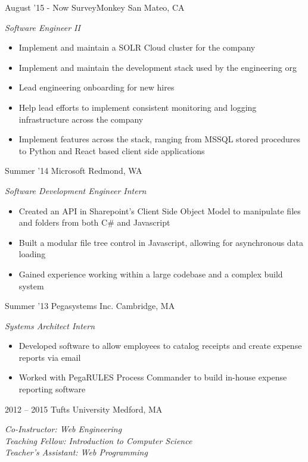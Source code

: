 \documentclass[print]{friggeri-cv} %
\begin{document}
\begin{entrylist}
\entry
{August '15 - Now}
{SurveyMonkey }
{San Mateo, CA}
{\emph{Software Engineer II}
\begin{itemize}
\item Implement and maintain a SOLR Cloud cluster for the company
\item Implement and maintain the development stack used by the engineering org
\item Lead engineering onboarding for new hires
\item Help lead efforts to implement consistent monitoring and logging infrastructure across the company
\item Implement features across the stack, ranging from MSSQL stored procedures to Python and React based client side applications
\end{itemize}}
\entry
{Summer '14}
{Microsoft }
{Redmond, WA}
{\emph{Software Development Engineer Intern}
\begin{itemize}
\item Created an API in Sharepoint's Client Side Object Model to manipulate files and folders from both C\# and Javascript 
\item Built a modular file tree control in Javascript, allowing for asynchronous data loading
\item Gained experience working within a large codebase and a complex build system
\end{itemize}}
\entry
{Summer '13}
{Pegasystems Inc. }
{Cambridge, MA}
{\emph{Systems Architect Intern} 
\begin{itemize}
\item Developed software to allow employees to catalog receipts and create expense reports via email
\item Worked with PegaRULES Process Commander to build in-house expense reporting software
\end{itemize}}
\entry
{2012 -- 2015}
{Tufts University}
{Medford, MA}
{\emph{Co-Instructor: Web Engineering \\Teaching Fellow: Introduction  to Computer Science \\ Teacher's Assistant: Web Programming} 
\begin{itemize}

\end{itemize}}
\end{entrylist}
\end{document}
